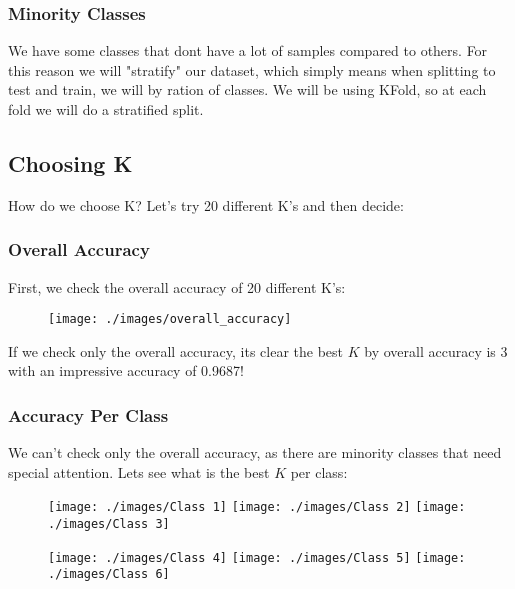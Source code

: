 \documentclass[11pt]{article}
\begin{document}
    \subsubsection*{Minority Classes}
    We have some classes that dont have a lot of samples compared to others.
    For this reason we will "stratify" our dataset, which simply means when splitting to test and train, we will by ration of classes.
    We will be using KFold, so at each fold we will do a stratified split.

    \subsection*{Choosing K}

    How do we choose K?
    Let's try 20 different K's and then decide:

    \subsubsection*{Overall Accuracy}
    First, we check the overall accuracy of 20 different K's:

    \begin{figure}[H]
        \centering
        \texttt{[image: ./images/overall\_accuracy]}
    \end{figure}

    If we check only the overall accuracy, its clear the best $K$ by overall accuracy is 3 with an impressive accuracy of 0.9687!

    \subsubsection*{Accuracy Per Class}
    We can't check only the overall accuracy, as there are minority classes that need special attention. Lets see what is the best $K$ per class:

    \begin{figure}[H]
        \texttt{[image: ./images/Class 1]}
        \texttt{[image: ./images/Class 2]}
        \texttt{[image: ./images/Class 3]}
    \end{figure}

    \begin{figure}[H]
        \texttt{[image: ./images/Class 4]}
        \texttt{[image: ./images/Class 5]}
        \texttt{[image: ./images/Class 6]}
    \end{figure}
\end{document}
